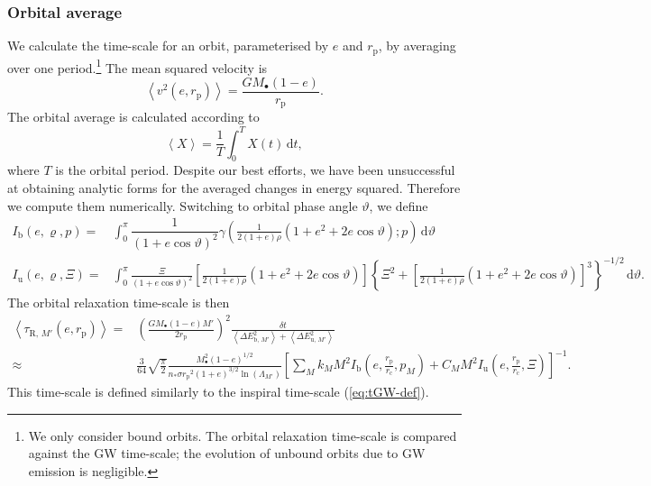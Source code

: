 \documentclass[useAMS,usedcolumn,usegraphicx,usenatbib]{mn2e}
\newcommand{\eqnref}[1]{(\ref{eq:#1})}
\newcommand{\sub}[1]{\ensuremath{_\mathrm{#1}}}
\newcommand{\dd}{\ensuremath{\mathrm{d}}}
\newcommand{\intd}[4]{\ensuremath{\displaystyle \int_{#1}^{#2}{#3}\,\dd{#4}}}
\newcommand{\recip}[1]{\ensuremath{\dfrac{1}{#1}}}
\begin{document}
\begin{onecolumn}
\subsubsection{Orbital average}\label{sec:orbital-ave}

We calculate the time-scale for an orbit, parameterised by $e$ and $r\sub{p}$, by averaging over one period.\footnote{We only consider bound orbits. The orbital relaxation time-scale is compared against the GW time-scale; the evolution of unbound orbits due to GW emission is negligible.} The mean squared velocity is
\begin{equation}
\left\langle v^2\left(e,r\sub{p}\right)\right\rangle = \frac{GM_\bullet(1 - e)}{r\sub{p}}.
\end{equation}
The orbital average is calculated according to \citep[section 2.2b]{Spitzer1987}
\begin{equation}
\left\langle X\right\rangle = \recip{T}\intd{0}{T}{X(t)}{t},
\end{equation}
where $T$ is the orbital period. Despite our best efforts, we have been unsuccessful at obtaining analytic forms for the averaged changes in energy squared. Therefore we compute them numerically. Switching to orbital phase angle $\vartheta$, we define
\begin{align}
I\sub{b}(e,\varrho,p) = {} & \intd{0}{\pi}{\recip{(1 + e \cos\vartheta)^2}\gamma\left(\frac{1}{2(1+e)\rho}\left(1+e^2+2e\cos\vartheta\right);p\right)}{\vartheta} \\
I\sub{u}(e,\varrho,\Xi) = {} & \intd{0}{\pi}{\frac{\Xi}{(1 + e \cos\vartheta)^2}\left[\frac{1}{2(1+e)\rho}\left(1+e^2+2e\cos\vartheta\right)\right]\left\{\Xi^2 + \left[\frac{1}{2(1+e)\rho}\left(1+e^2+2e\cos\vartheta\right)\right]^3\right\}^{-1/2}}{\vartheta}.
\end{align}
The orbital relaxation time-scale is then
\begin{align}
\left\langle\tau_{\mathrm{R},\,M'}\left(e,r\sub{p}\right)\right\rangle = {} & \left(\frac{GM_\bullet(1 - e)M'}{2r\sub{p}}\right)^2\frac{\delta t}{\left\langle\Delta E^2_{\mathrm{b},\,M'}\right\rangle + \left\langle\Delta E^2_{\mathrm{u},\,M'}\right\rangle} \\
 \approx {} & \frac{3}{64}\sqrt{\frac{\pi}{2}} \frac{M_\bullet^2(1 - e)^{1/2}}{n_\ast \sigma r\sub{p}^2(1 + e)^{3/2}\ln\left(\Lambda_{M'}\right)} \left[\sum_M k_M M^2 I\sub{b}\left(e,\frac{r\sub{p}}{r\sub{c}},p_M\right) + C_M M^2 I\sub{u}\left(e,\frac{r\sub{p}}{r\sub{c}},\Xi\right)\right]^{-1}.
\label{eq:orbital-relax}
\end{align}
This time-scale is defined similarly to the inspiral time-scale \eqnref{tGW-def}.


\end{onecolumn}
\end{document}
